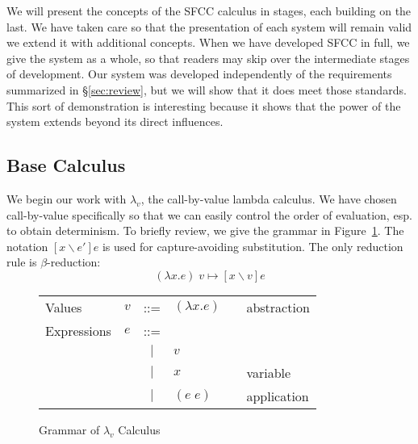 \documentclass[11pt]{article}
\newcommand\x{\lambda x}
\begin{document}
We will present the concepts of the SFCC calculus in stages, each building on the last.
We have taken care so that the presentation of each system will remain valid we extend it with additional concepts.
When we have developed SFCC in full, we give the system as a whole, so that readers may skip over the intermediate stages of development.
Our system was developed independently of the requirements summarized in \S\ref{sec:review}, but we will show that it does meet those standards.
This sort of demonstration is interesting because it shows that the power of the system extends beyond its direct influences.

\subsection{Base Calculus}

We begin our work with $\lambda_v$, the call-by-value lambda calculus.
We have chosen call-by-value specifically so that we can easily control the order of evaluation, esp. to obtain determinism.
To briefly review, we give the grammar in Figure~\ref{fig:lambdaCalculus}.
The notation $[x \backslash e']e$ is used for capture-avoiding substitution.
The only reduction rule is $\beta$-reduction:
$$(\x.e)\;v \mapsto [x \backslash v]e$$

\begin{figure}[H]
\caption{Grammar of $\lambda_v$ Calculus}
\label{fig:lambdaCalculus}

\begin{tabular}{llclll}
Values & $v$ & ::= & $(\lambda x.e)$ && abstraction\\
Expressions & $e$ & ::= & \\
& & $|$ & $v$ && \\
& & $|$ & $x$ && variable \\
& & $|$ & $(e\;e)$ && application \\
\end{tabular}
\end{figure}
\end{document}
